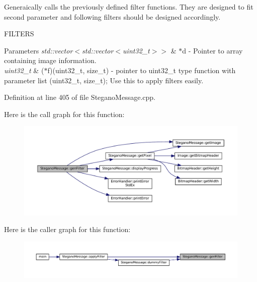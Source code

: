 Generaically calls the previously defined filter functions. They are designed to fit second parameter and following filters should be designed accordingly. 

F\+I\+L\+T\+E\+RS
\begin{DoxyParams}{Parameters}
{\em std\+::vector$<$std\+::vector$<$uint32\+\_\+t$>$$>$} & $\ast$d -\/ Pointer to array containing image information. \\
\hline
{\em uint32\+\_\+t} & ($\ast$f)(uint32\+\_\+t, size\+\_\+t) -\/ pointer to uint32\+\_\+t type function with parameter list (uint32\+\_\+t, size\+\_\+t); Use this to apply filters easily. \\
\hline
\end{DoxyParams}


Definition at line 405 of file Stegano\+Message.\+cpp.

Here is the call graph for this function\+:\nopagebreak
\begin{figure}[H]
\begin{center}
\leavevmode
\includegraphics[width=350pt]{classSteganoMessage_a1cb326688e9a054127396d198bd6f976_cgraph}
\end{center}
\end{figure}
Here is the caller graph for this function\+:\nopagebreak
\begin{figure}[H]
\begin{center}
\leavevmode
\includegraphics[width=350pt]{classSteganoMessage_a1cb326688e9a054127396d198bd6f976_icgraph}
\end{center}
\end{figure}
\mbox{\label{classSteganoMessage_a0134757a8c79caa9dca9bcce0686d1ef}} 
